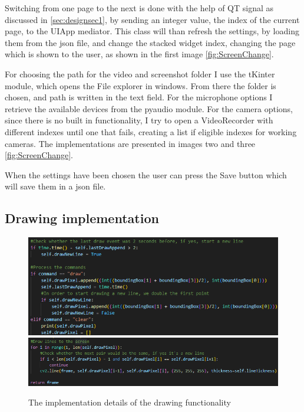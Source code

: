 \par Switching from one page to the next is done with the help of QT signal as discussed in \ref{sec:designsec1}, by sending an integer value, the index of the current page, to the UIApp mediator. This class will than refresh the settings, by loading them from the json file, and change the stacked widget index, changing the page which is shown to the user, as shown in the first image \ref{fig:ScreenChange}. 
\par For choosing the path for the video and screenshot folder I use the tKinter module, which opens the File explorer in windows. From there the folder is chosen, and path is written in the text field. For the microphone options I retrieve the available devices from the pyaudio module. For the camera options, since there is no built in functionality, I try to open a VideoRecorder with different indexes until one that fails, creating a list if eligible indexes for working cameras. The implementations are presented in images two and three \ref{fig:ScreenChange}.
\par When the settings have been chosen the user can press the Save button which will save them in a json file.

\subsection{Drawing implementation}
\label{sec:designsec5subsec5}

\begin{figure}
    \centering
    \includegraphics[width=0.4\linewidth]{figures/PointSaves.png}
    \includegraphics[width=0.4\linewidth]{figures/LineDrawings.png}
    \caption{The implementation details of the drawing functionality}
    \label{fig:DrawingImplementation}
\end{figure}

